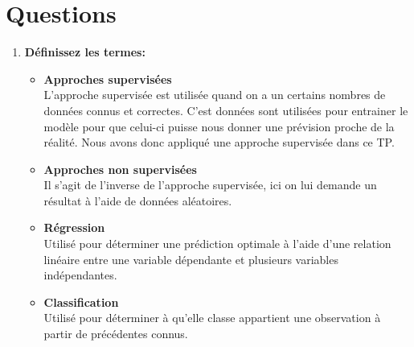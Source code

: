 \section{Questions}

\begin{enumerate}
    \item \textbf{Déﬁnissez les termes:}
    \begin{itemize}
        \item \textbf{Approches supervisées} \\
        L'approche supervisée est utilisée quand on a un certains nombres de données connus et correctes. C'est données sont utilisées pour entrainer le modèle pour que celui-ci puisse nous 
        donner une prévision proche de la réalité. Nous avons donc appliqué une approche supervisée dans ce TP.

        \item \textbf{Approches non supervisées} \\
        Il s'agit de l'inverse de l'approche supervisée, ici on lui demande un résultat à l'aide de données aléatoires.

        \item \textbf{Régression} \\
        Utilisé pour déterminer une prédiction optimale à l'aide d'une relation linéaire entre une variable dépendante et plusieurs variables indépendantes.

        \item \textbf{Classification} \\
        Utilisé pour déterminer à qu'elle classe appartient une observation à partir de précédentes connus.


\end{itemize}
\end{enumerate}
